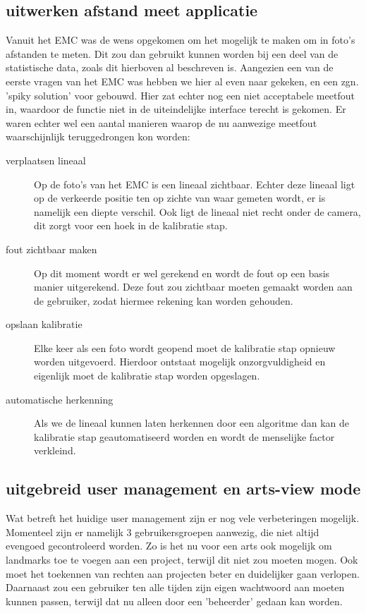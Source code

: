 \subsection{uitwerken afstand meet applicatie}
Vanuit het EMC was de wens opgekomen om het mogelijk te maken om in foto's afstanden te meten.
Dit zou dan gebruikt kunnen worden bij een deel van de statistische data, zoals dit hierboven al beschreven is.
Aangezien een van de eerste vragen van het EMC was hebben we hier al even naar gekeken, en een zgn. 'spiky solution' voor gebouwd.
Hier zat echter nog een niet acceptabele meetfout in, waardoor de functie niet in de uiteindelijke interface terecht is gekomen.
Er waren echter wel een aantal manieren waarop de nu aanwezige meetfout waarschijnlijk teruggedrongen kon worden:
\begin{description}
	\item[verplaatsen lineaal] Op de foto's van het EMC is een lineaal zichtbaar. Echter deze lineaal ligt op de verkeerde positie ten op zichte van waar gemeten wordt, er is namelijk een diepte verschil. Ook ligt de lineaal niet recht onder de camera, dit zorgt voor een hoek in de kalibratie stap.
	\item[fout zichtbaar maken] Op dit moment wordt er wel gerekend en wordt de fout op een basis manier uitgerekend. Deze fout zou zichtbaar moeten gemaakt worden aan de gebruiker, zodat hiermee rekening kan worden gehouden.
	\item[opslaan kalibratie] Elke keer als een foto wordt geopend moet de kalibratie stap opnieuw worden uitgevoerd. Hierdoor ontstaat mogelijk onzorgvuldigheid en eigenlijk moet de kalibratie stap worden opgeslagen.
	\item[automatische herkenning] Als we de lineaal kunnen laten herkennen door een algoritme dan kan de kalibratie stap geautomatiseerd worden en wordt de menselijke factor verkleind.
\end{description}

\subsection{uitgebreid user management en arts-view mode}
Wat betreft het huidige user management zijn er nog vele verbeteringen mogelijk.
Momenteel zijn er namelijk 3 gebruikersgroepen aanwezig, die niet altijd evengoed gecontroleerd worden.
Zo is het nu voor een arts ook mogelijk om landmarks toe te voegen aan een project, terwijl dit niet zou moeten mogen.
Ook moet het toekennen van rechten aan projecten beter en duidelijker gaan verlopen.
Daarnaast zou een gebruiker ten alle tijden zijn eigen wachtwoord aan moeten kunnen passen, terwijl dat nu alleen door een 'beheerder' gedaan kan worden.

